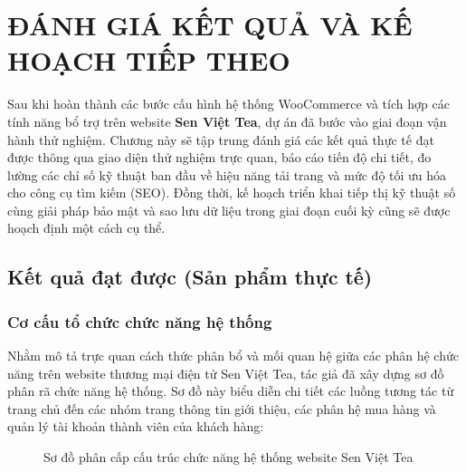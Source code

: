 \chapter{ĐÁNH GIÁ KẾT QUẢ VÀ KẾ HOẠCH TIẾP THEO}

Sau khi hoàn thành các bước cấu hình hệ thống WooCommerce và tích hợp các tính năng bổ trợ trên website \textbf{Sen Việt Tea}, dự án đã bước vào giai đoạn vận hành thử nghiệm. Chương này sẽ tập trung đánh giá các kết quả thực tế đạt được thông qua giao diện thử nghiệm trực quan, báo cáo tiến độ chi tiết, đo lường các chỉ số kỹ thuật ban đầu về hiệu năng tải trang và mức độ tối ưu hóa cho công cụ tìm kiếm (SEO). Đồng thời, kế hoạch triển khai tiếp thị kỹ thuật số cùng giải pháp bảo mật và sao lưu dữ liệu trong giai đoạn cuối kỳ cũng sẽ được hoạch định một cách cụ thể.

\section{Kết quả đạt được (Sản phẩm thực tế)}

\subsection{Cơ cấu tổ chức chức năng hệ thống}

Nhằm mô tả trực quan cách thức phân bổ và mối quan hệ giữa các phân hệ chức năng trên website thương mại điện tử Sen Việt Tea, tác giả đã xây dựng sơ đồ phân rã chức năng hệ thống. Sơ đồ này biểu diễn chi tiết các luồng tương tác từ trang chủ đến các nhóm trang thông tin giới thiệu, các phân hệ mua hàng và quản lý tài khoản thành viên của khách hàng:

\begin{figure}[H]
    \centering
    \caption{Sơ đồ phân cấp cấu trúc chức năng hệ thống website Sen Việt Tea}
    \label{fig:sitemap_structure}
\end{figure}

